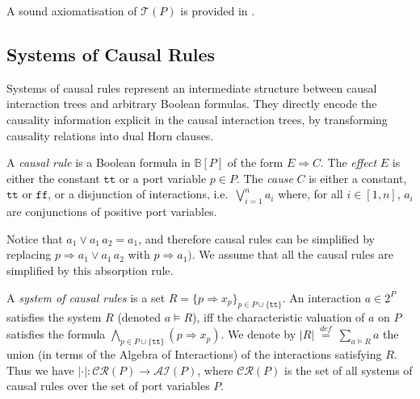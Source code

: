 \documentclass{llncs}
\newcommand{\secn}[1]{Sect.~\ref{secn:#1}}
\newcommand{\sB}{\ensuremath{\mathbb{B}}}
\newcommand{\mdash}[1][]{---#1}
\newcommand{\ie}[1][\ ]{i.e.#1}
\newcommand{\bydef}[1]{\ensuremath{\stackrel{\mathit{\scriptscriptstyle def}}{#1}}}
\newcommand{\true} {\ensuremath{\mathtt{t\!t}}}
\newcommand{\false}{\ensuremath{\mathtt{f\!f}}}
\newcommand{\ai}{\ensuremath{\mathcal{AI}}}
\newcommand{\ct}{\ensuremath{\mathcal{T}}}
\newcommand{\cru}{\ensuremath{\mathcal{CR}}}
\begin{document}
A sound axiomatisation of $\ct(P)$ is provided in
\cite{BliSif10-causal-fmsd}. 


\subsection{Systems of Causal Rules}
\label{secn:rules}

Systems of causal rules represent an intermediate structure between
causal interaction trees and arbitrary Boolean formulas.  They
directly encode the causality information explicit in the causal
interaction trees, by transforming causality relations into dual Horn
clauses. %

\begin{definition}
  A {\em causal rule} is a Boolean formula in $\sB[P]$ of the form $E
  \Rightarrow C$.  The \emph{effect} $E$ is either the constant
  $\true$ or a port variable $p \in P$.  The \emph{cause} $C$ is
  either a constant, $\true$ or $\false$, or a disjunction of
  interactions, \ie $\bigvee_{i=1}^n a_i$ where, for all $i\in [1,n]$,
  $a_i$ are conjunctions of positive port variables.
\end{definition}

\begin{note} \label{rem:absorption}
  Notice that $a_1 \lor a_1\,a_2 = a_1$, and therefore causal rules
  can be simplified by replacing $p \Rightarrow a_1 \lor a_1\,a_2$
  with $p \Rightarrow a_1)$.  We assume that all the causal rules are
  simplified by this absorption rule.
\end{note}

\begin{definition}
  A \emph{system of causal rules} is a set $R = \{p \Rightarrow
  x_p\}_{p\in P\cup \{\true\}}$.  An interaction $a \in 2^P$ satisfies
  the system $R$ (denoted $a \models R$), iff the characteristic
  valuation of $a$ on $P$ satisfies the formula $\bigwedge_{p\in P\cup
    \{\true\}} (p \Rightarrow x_p)$.  We denote by
  $|R|\ \bydef{=}\ \sum_{a \models R} a$ the union (in terms of the
  Algebra of Interactions) of the interactions satisfying $R$.  Thus
  we have $|\cdot| : \cru(P) \rightarrow \ai(P)$, where $\cru(P)$ is
  the set of all systems of causal rules over the set of port
  variables $P$.
\end{definition}
\end{document}

